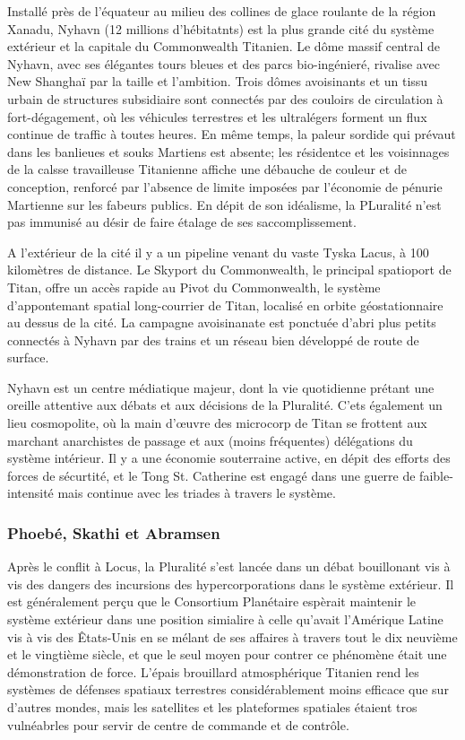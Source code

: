 Installé près de l'équateur au milieu des collines de glace roulante de la région Xanadu, Nyhavn (12 millions d'hébitatnts) est la plus grande cité du système extérieur et la capitale du Commonwealth Titanien. Le dôme massif central de Nyhavn, avec ses élégantes tours bleues et des parcs bio-ingénieré, rivalise avec New Shanghaï par la taille et l'ambition. Trois dômes avoisinants et un tissu urbain de structures subsidiaire sont connectés par des couloirs de circulation à fort-dégagement, où les véhicules terrestres et les ultralégers forment un flux continue de traffic à toutes heures. En même temps, la paleur sordide qui prévaut dans les banlieues et souks Martiens est absente; les résidentce et les voisinnages de  la calsse travailleuse Titanienne affiche une débauche de couleur et de conception, renforcé par l'absence de limite imposées par l'économie de pénurie Martienne sur les fabeurs publics. En dépit de son idéalisme, la PLuralité n'est pas immunisé au désir de faire étalage de ses saccomplissement. 

A l'extérieur de la cité il y a un pipeline venant du vaste Tyska Lacus, à 100 kilomètres de distance. Le Skyport du Commonwealth, le principal spatioport de Titan, offre un accès rapide au Pivot du Commonwealth, le système d'appontemant spatial long-courrier de Titan, localisé en orbite géostationnaire au dessus de la cité. La campagne avoisinanate est ponctuée d'abri plus petits connectés à Nyhavn par des trains et un réseau bien développé de route de surface. 

Nyhavn est un centre médiatique majeur, dont la vie quotidienne prétant une oreille attentive aux débats et aux décisions de la Pluralité. C'ets également un lieu cosmopolite, où la main d'œuvre des microcorp de Titan se frottent aux marchant anarchistes de passage et aux (moins fréquentes) délégations du système intérieur. Il y a une économie souterraine active, en dépit des efforts des forces de sécurtité, et le Tong St. Catherine est engagé dans une guerre de faible-intensité mais continue avec les triades à travers le système. 

\subsubsection{Phoebé, Skathi et Abramsen} \label{sec:phoebe-skathi-abrams} 

Après le conflit à Locus, la Pluralité s'est lancée dans un débat bouillonant vis à vis des dangers des incursions des hypercorporations dans le système extérieur. Il est généralement perçu que le Consortium Planétaire espèrait maintenir le système extérieur dans une position simialire à celle qu'avait l'Amérique Latine vis à vis des Êtats-Unis en se mélant de ses affaires à travers tout le dix neuvième et le vingtième siècle, et que le seul moyen pour contrer ce phénomène était une démonstration de force. L'épais brouillard atmosphérique Titanien rend les systèmes de défenses spatiaux terrestres considérablement moins efficace que sur d'autres mondes, mais les satellites et les plateformes spatiales étaient tros vulnéabrles pour servir de centre de commande et de contrôle. 

